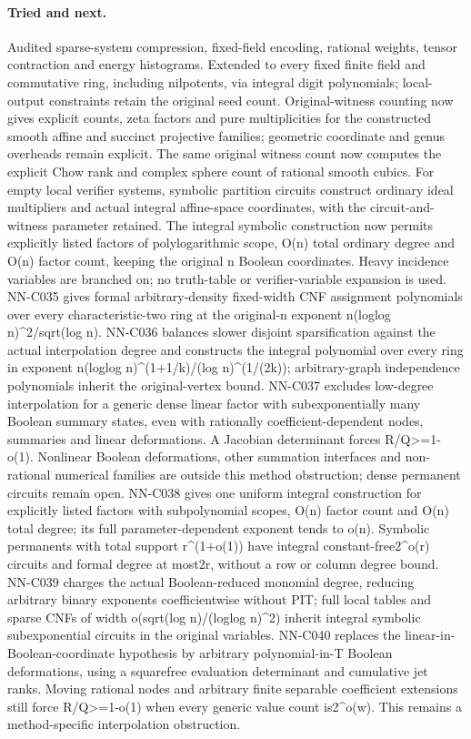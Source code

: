 \paragraph{Tried and next.} Audited sparse-system compression, fixed-field encoding, rational weights, tensor contraction and energy histograms. Extended to every fixed finite field and commutative ring, including nilpotents, via integral digit polynomials; local-output constraints retain the original seed count. Original-witness counting now gives explicit counts, zeta factors and pure multiplicities for the constructed smooth affine and succinct projective families; geometric coordinate and genus overheads remain explicit. The same original witness count now computes the explicit Chow rank and complex sphere count of rational smooth cubics. For empty local verifier systems, symbolic partition circuits construct ordinary ideal multipliers and actual integral affine-space coordinates, with the circuit-and-witness parameter retained. The integral symbolic construction now permits explicitly listed factors of polylogarithmic scope, O(n) total ordinary degree and O(n) factor count, keeping the original n Boolean coordinates. Heavy incidence variables are branched on; no truth-table or verifier-variable expansion is used. NN-C035 gives formal arbitrary-density fixed-width CNF assignment polynomials over every characteristic-two ring at the original-n exponent n(loglog n)\textasciicircum{}2/sqrt(log n). NN-C036 balances slower disjoint sparsification against the actual interpolation degree and constructs the integral polynomial over every ring in exponent n(loglog n)\textasciicircum{}(1+1/k)/(log n)\textasciicircum{}(1/(2k)); arbitrary-graph independence polynomials inherit the original-vertex bound. NN-C037 excludes low-degree interpolation for a generic dense linear factor with subexponentially many Boolean summary states, even with rationally coefficient-dependent nodes, summaries and linear deformations. A Jacobian determinant forces R/Q>=1-o(1). Nonlinear Boolean deformations, other summation interfaces and non-rational numerical families are outside this method obstruction; dense permanent circuits remain open. NN-C038 gives one uniform integral construction for explicitly listed factors with subpolynomial scopes, O(n) factor count and O(n) total degree; its full parameter-dependent exponent tends to o(n). Symbolic permanents with total support r\textasciicircum{}(1+o(1)) have integral constant-free2\textasciicircum{}o(r) circuits and formal degree at most2r, without a row or column degree bound. NN-C039 charges the actual Boolean-reduced monomial degree, reducing arbitrary binary exponents coefficientwise without PIT; full local tables and sparse CNFs of width o(sqrt(log n)/(loglog n)\textasciicircum{}2) inherit integral symbolic subexponential circuits in the original variables. NN-C040 replaces the linear-in-Boolean-coordinate hypothesis by arbitrary polynomial-in-T Boolean deformations, using a squarefree evaluation determinant and cumulative jet ranks. Moving rational nodes and arbitrary finite separable coefficient extensions still force R/Q>=1-o(1) when every generic value count is2\textasciicircum{}o(w). This remains a method-specific interpolation obstruction. 